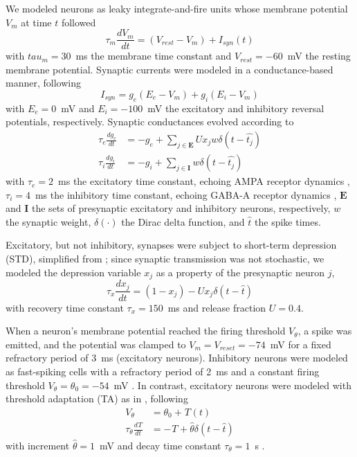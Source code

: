 \documentclass[pdflatex,referee,iicol,sn-basic]{sn-jnl}
\renewcommand{\T}[3][]{{}^{#1}_{}T^{#2}_{#3}}
\theoremstyle{thmstyleone}%
\theoremstyle{thmstyletwo}%
\theoremstyle{thmstylethree}%
\begin{document}
We modeled neurons as leaky integrate-and-fire units whose membrane potential $V_m$ at time $t$ followed
\begin{equation}
    \tau_m \frac{dV_m}{dt} = (V_{rest}-V_m) + I_{syn}(t)
\end{equation}
with $tau_m = 30$~ms the membrane time constant and $V_{rest} = -60$~mV the resting membrane potential. Synaptic currents were modeled in a conductance-based manner, following
\begin{equation}
    I_{syn} = g_e(E_e-V_m) + g_i(E_i-V_m)
\end{equation}
with $E_e = 0$~mV and $E_i = -100$~mV the excitatory and inhibitory reversal potentials, respectively. Synaptic conductances evolved according to
\begin{align} 
    \tau_e \frac{dg_e}{dt} &= -g_e + \sum_{j \in \boldsymbol E} U x_j w \delta(t - \hat{t_j}) \nonumber \\
    \tau_i \frac{dg_i}{dt} &= -g_i + \sum_{j \in \boldsymbol I} w \delta(t - \hat{t_j}) \label{eqn-gsyn}
\end{align}
with $\tau_e = 2$~ms the excitatory time constant, echoing AMPA receptor dynamics \citep{Hausser1997-cn}, $\tau_i = 4$~ms the inhibitory time constant, echoing GABA-A receptor dynamics \citep{Destexhe1994-oc}, $\boldsymbol E$ and $\boldsymbol I$ the sets of presynaptic excitatory and inhibitory neurons, respectively, $w$ the synaptic weight, $\delta(\cdot)$ the Dirac delta function, and $\hat{t}$ the spike times.

Excitatory, but not inhibitory, synapses were subject to short-term depression (STD), simplified from \cite{Tsodyks1997-qt}; since synaptic transmission was not stochastic, we modeled the depression variable $x_j$ as a property of the presynaptic neuron $j$,
\begin{equation}
    \tau_x \frac{dx_j}{dt} = (1-x_j) - U x_j \delta(t - \hat{t}) \label{eqn-xsyn}
\end{equation}
with recovery time constant $\tau_x = 150$~ms and release fraction $U = 0.4$.

When a neuron's membrane potential reached the firing threshold $V_\theta$, a spike was emitted, and the potential was clamped to $V_m = V_{reset} = -74$~mV for a fixed refractory period of 3~ms (excitatory neurons). Inhibitory neurons were modeled as fast-spiking cells with a refractory period of 2~ms and a constant firing threshold $V_\theta = \theta_0 = -54$~mV \citep{Mensi2012-au}. In contrast, excitatory neurons were modeled with threshold adaptation (TA) as in \cite{Teeter2018-iz}, following
\begin{align}
    V_\theta &= \theta_0 + \T{}{}(t) \nonumber \\
    \tau_{\theta} \frac{d\T{}{}}{dt} &= -\T{}{} + \hat{\theta} \delta(t - \hat{t}) \label{eqn-TA}
\end{align}
with increment $\hat{\theta} = 1$~mV and decay time constant $\tau_{\theta} = 1$~s \citep{Pozzorini2015-ei}.
\end{document}
